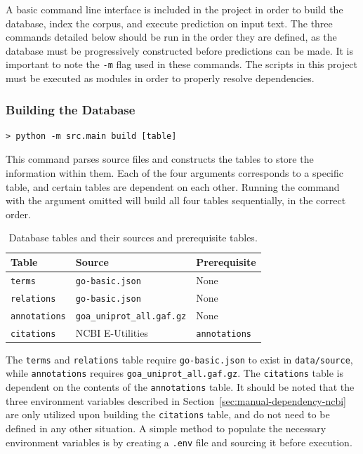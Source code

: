\documentclass[11pt]{article}
\theoremstyle{plain}
\theoremstyle{definition}
\begin{document}
A basic command line interface is included in the project in order to build the database, index the corpus, and execute prediction on input text. The three commands detailed below should be run in the order they are defined, as the database must be progressively constructed before predictions can be made. It is important to note the \verb|-m| flag used in these commands. The scripts in this project must be executed as modules in order to properly resolve dependencies.

\subsubsection{Building the Database}\label{sec:manual-cli-build}

\begin{Verbatim}[frame=single, fontsize=\small]
    > python -m src.main build [table]
\end{Verbatim}

This command parses source files and constructs the tables to store the information within them. Each of the four arguments corresponds to a specific table, and certain tables are dependent on each other. Running the command with the argument omitted will build all four tables sequentially, in the correct order.

\begin{table}[H]
    \centering
    \begin{tabular}{|l|l|l|}
        \hline
        \textbf{Table}       & \textbf{Source}                   & \textbf{Prerequisite} \\
        \hline
        \texttt{terms}       & \texttt{go-basic.json}            & None                  \\
        \hline
        \texttt{relations}   & \texttt{go-basic.json}            & None                  \\
        \hline
        \texttt{annotations} & \texttt{goa\_uniprot\_all.gaf.gz} & None                  \\
        \hline
        \texttt{citations}   & NCBI E-Utilities                  & \texttt{annotations}  \\
        \hline
    \end{tabular}
    \caption{Database tables and their sources and prerequisite tables.}\label{tab:db_prereq}
\end{table}

The \verb|terms| and \verb|relations| table require \verb|go-basic.json| to exist in \verb|data/source|, while \verb|annotations| requires \verb|goa_uniprot_all.gaf.gz|. The \verb|citations| table is dependent on the contents of the \verb|annotations| table. It should be noted that the three environment variables described in Section~\ref{sec:manual-dependency-ncbi} are only utilized upon building the \verb|citations| table, and do not need to be defined in any other situation. A simple method to populate the necessary environment variables is by creating a \verb|.env| file and sourcing it before execution.
\end{document}
